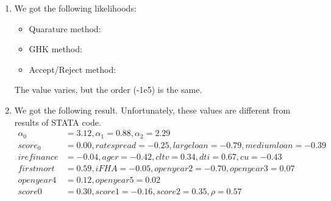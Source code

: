 \documentclass{article}
\begin{document}
\begin{enumerate}
\item We got the following likelihoods: 
  \begin{itemize}
  \item  Quarature method:
  \item  GHK method:
  \item  Accept/Reject method:
  \end{itemize}
  The value varies, but the order (-1e5) is the same.  
\item We got the following result. Unfortunately, these values are different from results of STATA code.
  \begin{align*}
    \alpha_0 &= 3.12, \alpha_1 = 0.88, \alpha_2 = 2.29 \\
    score_0 &= 0.00, rate spread = -0.25, large loan = -0.79, medium loan = -0.39 \\ 
    i refinance &= -0.04, age r = -0.42, cltv = 0.34, dti = 0.67, cu = -0.43 \\
    first mort &= 0.59, i FHA = -0.05, open year 2 = -0.70,open year 3 = 0.07 \\ 
    open year 4 &= 0.12, open year 5 =0.02 \\
    score0  &= 0.30, score1 = -0.16, score2 = 0.35, \rho = 0.57 
  \end{align*}
\end{enumerate}
\end{document}
